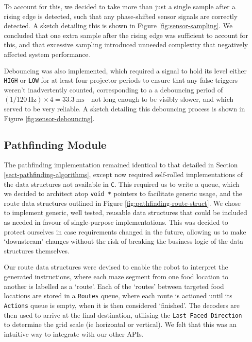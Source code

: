 \documentclass[conference]{IEEEtran}
\begin{document}
To account for this, we decided to take more than just a single sample after a rising edge is detected, such that any phase-shifted sensor signals are correctly detected.
A sketch detailing this is shown in Figure \ref{fig:sensor-sampling}.
We concluded that one extra sample after the rising edge was sufficient to account for this, and that excessive sampling introduced unneeded complexity that negatively affected system performance.

Debouncing was also implemented, which required a signal to hold its level either \texttt{HIGH} or \texttt{LOW} for at least four projector periods to ensure that any false triggers weren't inadvertently counted, corresponding to a a debouncing period of $\left(1 / \qty{120}{\hertz}\right) \times 4 = \qty{33.3}{\ms}$—not long enough to be visibly slower, and which served to be very reliable.
A sketch detailing this debouncing process is shown in Figure \ref{fig:sensor-debouncing}.

\subsection{Pathfinding Module}

The pathfinding implementation remained identical to that detailed in Section \ref{sect-pathfinding-algorithms}, except now required self-rolled implementations of the data structures not available in \texttt{C}.
This required us to write a queue, which we decided to architect atop \texttt{void *} pointers to facilitate generic usage, and the route data structures outlined in Figure \ref{fig:pathfinding-route-struct}.
We chose to implement generic, well tested, reusable data structures that could be included as needed in favour of single-purpose implementations.
This was decided to protect ourselves in case requirements changed in the future, allowing us to make `downstream' changes without the risk of breaking the business logic of the data structures themselves.

Our route data structures were devised to enable the robot to interpret the generated instructions, where each maze segment from one food location to another is labelled as a `route'.
Each of the `routes' between targeted food locations are stored in a \texttt{Routes} queue, where each route is actioned until its \texttt{Actions} queue is empty, when it is then considered `finished'.
The decoders are then used to arrive at the final destination, utilising the \texttt{Last Faced Direction} to determine the grid scale (ie horizontal or vertical).
We felt that this was an intuitive way to integrate with our other APIs.
\end{document}
